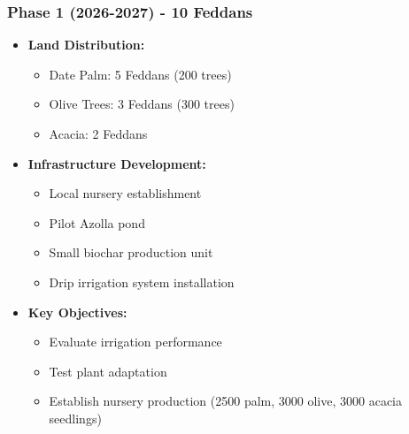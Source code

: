 \subsubsection{Phase 1 (2026-2027) - 10 Feddans}
\begin{itemize}
    \item \textbf{Land Distribution:}
    \begin{itemize}
        \item Date Palm: 5 Feddans (200 trees)
        \item Olive Trees: 3 Feddans (300 trees)
        \item Acacia: 2 Feddans
    \end{itemize}
    
    \item \textbf{Infrastructure Development:}
    \begin{itemize}
        \item Local nursery establishment
        \item Pilot Azolla pond
        \item Small biochar production unit
        \item Drip irrigation system installation
    \end{itemize}
    
    \item \textbf{Key Objectives:}
    \begin{itemize}
        \item Evaluate irrigation performance
        \item Test plant adaptation
        \item Establish nursery production (2500 palm, 3000 olive, 3000 acacia seedlings)
    \end{itemize}
\end{itemize}

